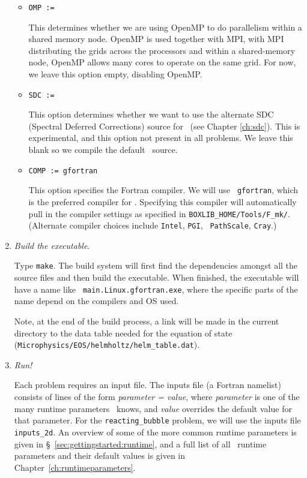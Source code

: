 \begin{enumerate}
\begin{itemize}
  \item {\tt OMP := }

    This determines whether we are using OpenMP to do parallelism
    within a shared memory node.  OpenMP is used together with MPI,
    with MPI distributing the grids across the processors and within a
    shared-memory node, OpenMP allows many cores to operate on the
    same grid.  For now, we leave this option empty, disabling OpenMP.

  \item {\tt SDC := }

    This option determines whether we want to use the alternate SDC
    (Spectral Deferred Corrections) source for \maestro\ (see Chapter
    \ref{ch:sdc}).  This is experimental, and this option not present
    in all problems.  We leave this blank so we compile the default
    \maestro\ source.

  \item {\tt COMP := gfortran}

    This option specifies the Fortran compiler.  We will use {\tt
      gfortran}, which is the preferred compiler for \maestro.
    Specifying this compiler will automatically pull in the compiler
    settings as specified in {\tt BOXLIB\_HOME/Tools/F\_mk/}.
    (Alternate compiler choices include {\tt Intel}, {\tt PGI}, {\tt
      PathScale}, {\tt Cray}.)

  \end{itemize}


\item {\em Build the executable}.

  Type {\tt make}.  The build system will first find the dependencies
  amongst all the source files and then build the executable.  When
  finished, the executable will have a name like {\tt
    main.Linux.gfortran.exe}, where the specific parts of the name
  depend on the compilers and OS used.

  Note, at the end of the build process, a link will be made in the
  current directory to the data table needed for the equation of state
  ({\tt Microphysics/EOS/helmholtz/helm\_table.dat}).


\item {\em Run!}

  Each problem requires an input file.  The inputs file (a Fortran
  namelist) consists of lines of the form {\em parameter = value},
  where {\em parameter} is one of the many runtime parameters
  \maestro\ knows, and {\em value} overrides the default value for
  that parameter.  For the {\tt reacting\_bubble} problem, we will use
  the inputs file {\tt inputs\_2d}.  An overview of some of the more
  common runtime parameters is given in
  \S~\ref{sec:gettingstarted:runtime}, and a full list of all
  \maestro\ runtime parameters and their default values is given in
  Chapter~\ref{ch:runtimeparameters}.


\end{enumerate}
